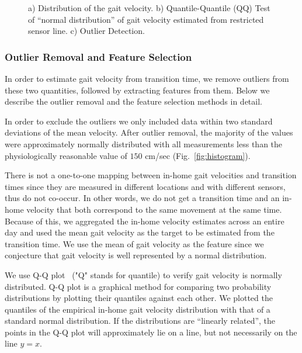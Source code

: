 \documentclass[journal]{IEEEtran}
\begin{document}
\begin{figure}[ht]
\centering
{}
\caption{a) Distribution  of the gait velocity. b) Quantile-Quantile (QQ) Test of ``normal distribution'' of gait velocity estimated from restricted sensor line. c) Outlier Detection.}
\label{fig:walkSpedAnalysis}
\end{figure}


\subsubsection{Outlier Removal and Feature Selection}
\label{sec:DataAnalysisAndFeatureSelection}

In order to estimate gait velocity from transition time, we remove outliers from these two quantities, followed by extracting features from them. Below we describe the outlier removal and the feature selection methods in detail.


In order to exclude the outliers we only included data within two standard deviations of the mean velocity. After outlier removal, the majority of the values were approximately normally distributed with all measurements less than the physiologically reasonable value of $150$ cm/sec (Fig.~\ref{fig:histogram}). 



There is not a one-to-one mapping between in-home gait velocities and transition times since they are measured in different locations and with different sensors, thus do not co-occur. In other words, we do not get a transition time and an in-home velocity that both correspond to the same movement at the same time.  Because of this, we aggregated the in-home velocity estimates across an entire day and used the mean gait velocity as the target to be estimated from the transition time. We use the mean of gait velocity as the feature since  we conjecture that gait velocity is well represented by a normal distribution. 


We use Q-Q plot~\cite{wilk1968probability} ("Q" stands for quantile) to verify gait velocity is normally distributed. Q-Q plot is a graphical method for comparing two probability distributions by plotting their quantiles against each other. We plotted the quantiles of the empirical in-home gait velocity distribution with that of a standard normal distribution. 
If the distributions are ``linearly related'', the points in the Q-Q plot will approximately lie on a line, but not necessarily on the line $y = x$. 
\end{document}
